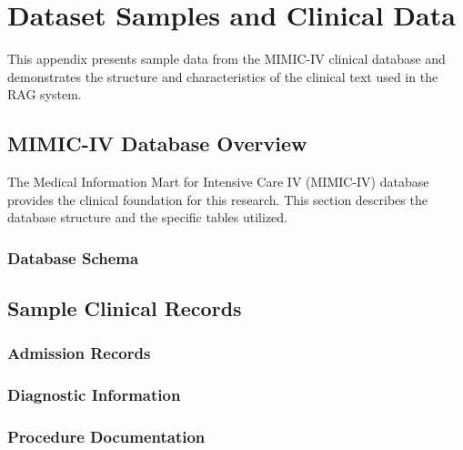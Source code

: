 \chapter{Dataset Samples and Clinical Data}
\label{appendix:dataset}

This appendix presents sample data from the MIMIC-IV clinical database and demonstrates the structure and characteristics of the clinical text used in the RAG system.

\section{MIMIC-IV Database Overview}

The Medical Information Mart for Intensive Care IV (MIMIC-IV) database provides the clinical foundation for this research. This section describes the database structure and the specific tables utilized.

\subsection{Database Schema}

\section{Sample Clinical Records}

\subsection{Admission Records}

\subsection{Diagnostic Information}

\subsection{Procedure Documentation}


